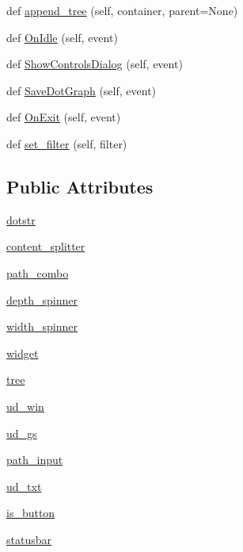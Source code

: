 \begin{DoxyCompactItemize}
def \hyperlink{classsmacc__viewer_1_1SmaccViewerFrame_ad0b858bdd41097ab0ade9e86d3bbe681}{append\+\_\+tree} (self, container, parent=None)
\item 
def \hyperlink{classsmacc__viewer_1_1SmaccViewerFrame_a586b0e0e4074a3ef1d094f5b24eeb8fd}{On\+Idle} (self, event)
\item 
def \hyperlink{classsmacc__viewer_1_1SmaccViewerFrame_a2a8cf7684b6a1ead537056e9e24e6340}{Show\+Controls\+Dialog} (self, event)
\item 
def \hyperlink{classsmacc__viewer_1_1SmaccViewerFrame_a1c2e0e8907a1600a3a60fa5cd556bf99}{Save\+Dot\+Graph} (self, event)
\item 
def \hyperlink{classsmacc__viewer_1_1SmaccViewerFrame_a85d2f2dcb85869cf58fc47b24b1f3e3a}{On\+Exit} (self, event)
\item 
def \hyperlink{classsmacc__viewer_1_1SmaccViewerFrame_a5082dd2028d5944ab4640ba670f8ebf3}{set\+\_\+filter} (self, filter)
\end{DoxyCompactItemize}
\subsection*{Public Attributes}
\begin{DoxyCompactItemize}
\item 
\hyperlink{classsmacc__viewer_1_1SmaccViewerFrame_af4c9a551ac2933b05aaae2adcbb26d63}{dotstr}
\item 
\hyperlink{classsmacc__viewer_1_1SmaccViewerFrame_a601f77701e7f32378b77b1b154e27215}{content\+\_\+splitter}
\item 
\hyperlink{classsmacc__viewer_1_1SmaccViewerFrame_a2b2ee042e4a0d11372e1d12c1925a286}{path\+\_\+combo}
\item 
\hyperlink{classsmacc__viewer_1_1SmaccViewerFrame_abb2756c3503845a85a64c99a7479af63}{depth\+\_\+spinner}
\item 
\hyperlink{classsmacc__viewer_1_1SmaccViewerFrame_a9e092051eb4c76d6721dcea6c5c48cde}{width\+\_\+spinner}
\item 
\hyperlink{classsmacc__viewer_1_1SmaccViewerFrame_a18de3813fb0bf9d3c5a4315174be3761}{widget}
\item 
\hyperlink{classsmacc__viewer_1_1SmaccViewerFrame_acb413cad9d12ad71bbb44e26ff9149fd}{tree}
\item 
\hyperlink{classsmacc__viewer_1_1SmaccViewerFrame_a156f622cd2bb567715ae668735574e1a}{ud\+\_\+win}
\item 
\hyperlink{classsmacc__viewer_1_1SmaccViewerFrame_afde6b1e161cbf76307ebc82f15037163}{ud\+\_\+gs}
\item 
\hyperlink{classsmacc__viewer_1_1SmaccViewerFrame_ab4ef6a1eb110cd0497c3e37bf66b79d7}{path\+\_\+input}
\item 
\hyperlink{classsmacc__viewer_1_1SmaccViewerFrame_ab02d72e8e1fa56529513e55da6c3f581}{ud\+\_\+txt}
\item 
\hyperlink{classsmacc__viewer_1_1SmaccViewerFrame_a9d2088f270fd6dfd646aa23af2fefc69}{is\+\_\+button}
\item 
\hyperlink{classsmacc__viewer_1_1SmaccViewerFrame_a17f4cb445baf1ae74641c512c8a71046}{statusbar}
\end{DoxyCompactItemize}
